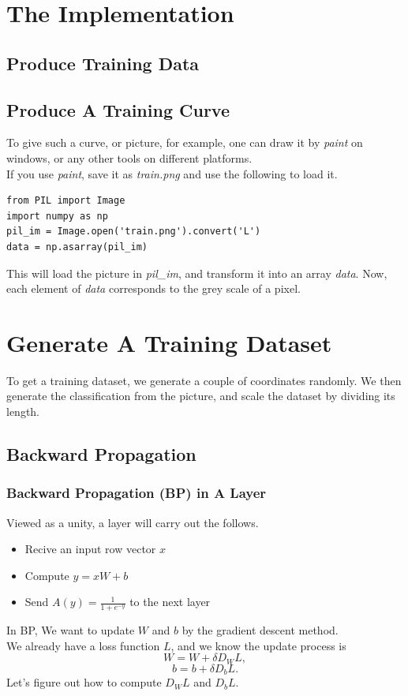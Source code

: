 \section{The Implementation}
\subsection{Produce Training Data}

\subsection{Produce A Training Curve}

To give such a curve, or picture, for example, one can draw it by \emph{paint} on windows, or any other tools on different platforms.\\
If you use \emph{paint}, save it as \emph{train.png} and use the following to load it.

\begin{lstlisting}
from PIL import Image
import numpy as np
pil_im = Image.open('train.png').convert('L')
data = np.asarray(pil_im)
\end{lstlisting}

This will load the picture in \emph{pil\_im}, and transform it into an array \emph{data}. Now, each element of \emph{data} corresponds to the grey scale of a pixel.\\

\section{Generate A Training Dataset}

To get a training dataset, we generate a couple of coordinates randomly. We then generate the classification from the picture, and scale the dataset by dividing its length.

\subsection{Backward Propagation}
\subsubsection{Backward Propagation (BP) in A Layer}
Viewed as a unity, a layer will carry out the follows.
\begin{itemize}
\item Recive an input row vector $x$
\item Compute $y=xW+b$
\item Send $A(y)=\frac{1}{1+e^{-y}}$ to the next layer
\end{itemize}
In BP, We want to update $W$ and $b$ by the gradient descent method.\\
We already have a loss function $L$, and we know the update process is
\[W = W + \delta D_WL,\]
\[b = b+\delta D_bL.\]
Let's figure out how to compute $D_WL$ and $D_bL$.


